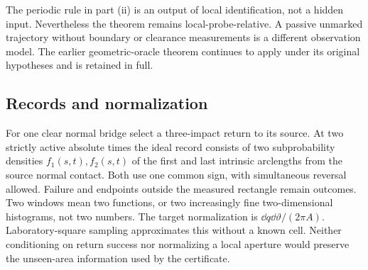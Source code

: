 The periodic rule in part (ii) is an output of local identification,
not a hidden input. Nevertheless the theorem remains local-probe-relative.
A passive unmarked trajectory without boundary or clearance measurements
is a different observation model. The earlier geometric-oracle theorem
continues to apply under its original hypotheses and is retained in full.

\subsection{Records and normalization}
For one clear normal bridge select a three-impact return to its source.
At two strictly active absolute times the ideal record consists of two
subprobability densities $f_1(s,t),f_2(s,t)$ of the first and last
intrinsic arclengths from the source normal contact. Both use one common
sign, with simultaneous reversal allowed. Failure and endpoints outside
the measured rectangle remain outcomes. Two windows mean two functions,
or two increasingly fine two-dimensional histograms, not two numbers.
The target normalization is $\dd q\dd\vartheta/(2\pi A)$.
Laboratory-square sampling approximates this without a known cell.
Neither conditioning on return success nor normalizing a local aperture
would preserve the unseen-area information used by the certificate.
